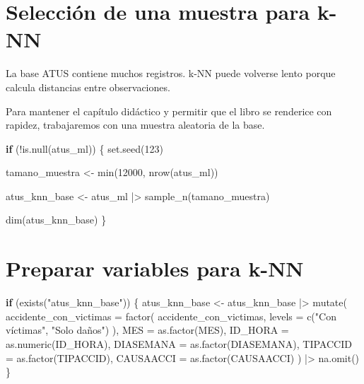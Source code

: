 \documentclass[
  11pt,
  letterpaper,
]{book}
\newenvironment{Shaded}{\begin{snugshade}}{\end{snugshade}}
\newcommand{\AttributeTok}[1]{\textcolor[rgb]{0.40,0.45,0.13}{#1}}
\newcommand{\ControlFlowTok}[1]{\textcolor[rgb]{0.00,0.23,0.31}{\textbf{#1}}}
\newcommand{\DecValTok}[1]{\textcolor[rgb]{0.68,0.00,0.00}{#1}}
\newcommand{\FunctionTok}[1]{\textcolor[rgb]{0.28,0.35,0.67}{#1}}
\newcommand{\NormalTok}[1]{\textcolor[rgb]{0.00,0.23,0.31}{#1}}
\newcommand{\OtherTok}[1]{\textcolor[rgb]{0.00,0.23,0.31}{#1}}
\newcommand{\SpecialCharTok}[1]{\textcolor[rgb]{0.37,0.37,0.37}{#1}}
\newcommand{\StringTok}[1]{\textcolor[rgb]{0.13,0.47,0.30}{#1}}
\begin{document}
\section{Selección de una muestra para
k-NN}\label{selecciuxf3n-de-una-muestra-para-k-nn}

La base ATUS contiene muchos registros. k-NN puede volverse lento porque
calcula distancias entre observaciones.

Para mantener el capítulo didáctico y permitir que el libro se renderice
con rapidez, trabajaremos con una muestra aleatoria de la base.

\begin{Shaded}
\begin{Highlighting}[]
\ControlFlowTok{if}\NormalTok{ (}\SpecialCharTok{!}\FunctionTok{is.null}\NormalTok{(atus\_ml)) \{}
  \FunctionTok{set.seed}\NormalTok{(}\DecValTok{123}\NormalTok{)}

\NormalTok{  tamano\_muestra }\OtherTok{\textless{}{-}} \FunctionTok{min}\NormalTok{(}\DecValTok{12000}\NormalTok{, }\FunctionTok{nrow}\NormalTok{(atus\_ml))}

\NormalTok{  atus\_knn\_base }\OtherTok{\textless{}{-}}\NormalTok{ atus\_ml }\SpecialCharTok{|\textgreater{}}
    \FunctionTok{sample\_n}\NormalTok{(tamano\_muestra)}

  \FunctionTok{dim}\NormalTok{(atus\_knn\_base)}
\NormalTok{\}}
\end{Highlighting}
\end{Shaded}

\section{Preparar variables para
k-NN}\label{preparar-variables-para-k-nn}

\begin{Shaded}
\begin{Highlighting}[]
\ControlFlowTok{if}\NormalTok{ (}\FunctionTok{exists}\NormalTok{(}\StringTok{"atus\_knn\_base"}\NormalTok{)) \{}
\NormalTok{  atus\_knn\_base }\OtherTok{\textless{}{-}}\NormalTok{ atus\_knn\_base }\SpecialCharTok{|\textgreater{}}
    \FunctionTok{mutate}\NormalTok{(}
      \AttributeTok{accidente\_con\_victimas =} \FunctionTok{factor}\NormalTok{(}
\NormalTok{        accidente\_con\_victimas,}
        \AttributeTok{levels =} \FunctionTok{c}\NormalTok{(}\StringTok{"Con víctimas"}\NormalTok{, }\StringTok{"Solo daños"}\NormalTok{)}
\NormalTok{      ),}
      \AttributeTok{MES =} \FunctionTok{as.factor}\NormalTok{(MES),}
      \AttributeTok{ID\_HORA =} \FunctionTok{as.numeric}\NormalTok{(ID\_HORA),}
      \AttributeTok{DIASEMANA =} \FunctionTok{as.factor}\NormalTok{(DIASEMANA),}
      \AttributeTok{TIPACCID =} \FunctionTok{as.factor}\NormalTok{(TIPACCID),}
      \AttributeTok{CAUSAACCI =} \FunctionTok{as.factor}\NormalTok{(CAUSAACCI)}
\NormalTok{    ) }\SpecialCharTok{|\textgreater{}}
    \FunctionTok{na.omit}\NormalTok{()}
\NormalTok{\}}
\end{Highlighting}
\end{Shaded}
\end{document}
